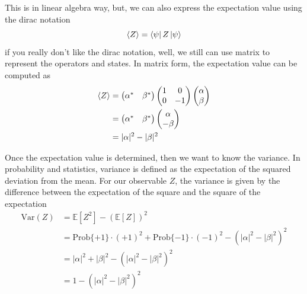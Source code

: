 \documentclass[11pt, letterpaper]{article}
\begin{document}
This is in linear algebra way, but, we can also express the expectation value using the dirac notation
\begin{equation}
    \braket{Z} = \bra{\psi} Z \ket{\psi} 
\end{equation}
if you really don't like the dirac notation, well, we still can use matrix to represent the operators and states. In matrix form, the expectation value can be computed as
\begin{equation}
  \begin{aligned}
    \braket{Z} &= \begin{pmatrix} \alpha^* & \beta^* \end{pmatrix} \begin{pmatrix} 1 & 0 \\ 0 & -1 \end{pmatrix} \begin{pmatrix} \alpha \\ \beta \end{pmatrix} \\
    &= \begin{pmatrix} \alpha^* & \beta^* \end{pmatrix} \begin{pmatrix} \alpha \\ -\beta \end{pmatrix} \\
    &= |\alpha|^2 - |\beta|^2
  \end{aligned}
\end{equation}

Once the expectation value is determined, then we want to know the variance. In probability and statistics, variance is defined as the expectation of the squared deviation from the mean. For our observable $Z$, the variance is given by the difference between the expectation of the square and the square of the expectation
\begin{equation}
  \begin{aligned}
    \text{Var}(Z) &= \mathbb{E}[Z^2] - (\mathbb{E}[Z])^2 \\
    &= \text{Prob}\{+1\} \cdot (+1)^2 + \text{Prob}\{-1\} \cdot (-1)^2 - \left( |\alpha|^2 - |\beta|^2 \right)^2 \\
    &= |\alpha|^2 + |\beta|^2 - \left( |\alpha|^2 - |\beta|^2 \right)^2 \\
    &= 1 - \left( |\alpha|^2 - |\beta|^2 \right)^2
  \end{aligned}
\end{equation}
\end{document}
